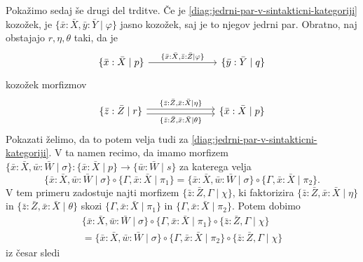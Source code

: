 \documentclass[../kategoricna_logika.tex]{subfiles}
\begin{document}
\begin{dokaz}
\begin{enumerate}[label=(\roman*)]
    Pokažimo sedaj še drugi del trditve.  Če je
    \eqref{diag:jedrni-par-v-sintakticni-kategoriji} kozožek, je
    $\{\bar{x}:\bar{X},\bar{y}:\bar{Y} \mid \varphi \}$ jasno kozožek, saj je to njegov jedrni
    par. Obratno, naj obstajajo $r, \eta, \theta$ taki, da je
    \begin{equation*}
      \begin{tikzcd}[column sep=7em]
        {\lbrace \bar{x}:\bar{X} \mid p \rbrace}
        \ar[r, "{\lbrace \bar{x}:\bar{X},\bar{z}:\bar{Z} \mid \varphi \rbrace}"] &
        {\lbrace \bar{y}:\bar{Y} \mid q \rbrace}
      \end{tikzcd}
    \end{equation*}
    kozožek morfizmov
    \begin{equation*}
      \begin{tikzcd}[column sep=7em]
        \lbrace \bar{z}:\bar{Z} \mid r \rbrace \ar[r, shift left, "{\lbrace \bar{z}:\bar{Z},\bar{x}:\bar{X} \mid \eta
        \rbrace}"] \ar[r, shift right, "{\lbrace \bar{z}:\bar{Z},\bar{x}:\bar{X} \mid \theta \rbrace}"'] & {\lbrace \bar{x}:\bar{X} \mid p \rbrace}
      \end{tikzcd}
    \end{equation*}
    Pokazati želimo, da to potem velja tudi za
    \eqref{diag:jedrni-par-v-sintakticni-kategoriji}. V ta namen
    recimo, da imamo morfizem
    $\{ \bar{x}:\bar{X}, \bar{w}:\bar{W} \mid \sigma \} :
    \{ \bar{x}:\bar{X} \mid p\} \to \{ \bar{w}:\bar{W} \mid s\}$ za katerega velja
    $$\{ \bar{x}:\bar{X}, \bar{w}:\bar{W} \mid \sigma \} \circ \{\Gamma ,\bar{x}:\bar{X} \mid \pi_1\} =
    \{ \bar{x}:\bar{X}, \bar{w}:\bar{W} \mid \sigma \} \circ \{\Gamma ,\bar{x}:\bar{X} \mid \pi_2\}.$$
    V tem
    primeru zadostuje najti morfizem $\{\bar{z}:\bar{Z},\Gamma \mid \chi\}$, ki faktorizira
    ${\lbrace \bar{z}:\bar{Z},\bar{x}:\bar{X} \mid \eta\rbrace}$ in
    ${\lbrace \bar{z}:\bar{Z},\bar{x}:\bar{X} \mid \theta \rbrace}$ skozi
    $\{\Gamma ,\bar{x}:\bar{X} \mid \pi_1\}$ in $\{\Gamma ,\bar{x}:\bar{X} \mid \pi_2\}$. Potem
    dobimo
\begin{multline*}
    \{ \bar{x}:\bar{X}, \bar{w}:\bar{W} \mid \sigma\} \circ \{\Gamma ,\bar{x}:\bar{X} \mid \pi_1\} \circ
    \{\bar{z}:\bar{Z},\Gamma \mid \chi\} \\
    = \{ \bar{x}:\bar{X}, \bar{w}:\bar{W} \mid \sigma \} \circ
      \{\Gamma ,\bar{x}:\bar{X} \mid \pi_2\} \circ \{\bar{z}:\bar{Z},\Gamma \mid \chi\}
      \end{multline*}
    iz česar sledi
\begin{multline*}

\end{multline*}
\end{enumerate}
\end{dokaz}
\end{document}
